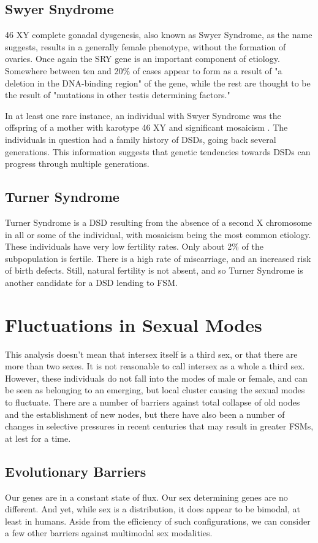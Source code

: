 \documentclass{article}
\begin{document}
\subsection{Swyer Snydrome}
46 XY complete gonadal dysgenesis, also known as Swyer Syndrome, as the name suggests, results in a generally female phenotype, without the formation of ovaries. Once again the SRY gene is an important component of etiology. Somewhere between ten and 20\% of cases appear to form as a result of "a deletion in the DNA-binding region" of the gene, while the rest are thought to be the result of "mutations in other testis determining factors."\cite{Michala2008}

In at least one rare instance, an individual with Swyer Syndrome was the offspring of a mother with karotype 46 XY and significant mosaicism \cite{Dumic2008}. The individuals in question had a family history of DSDs, going back several generations\cite{Dumic2008}. This information suggests that genetic tendencies towards DSDs can progress through multiple generations. 
\subsection{Turner Syndrome}
Turner Syndrome is a DSD resulting from the absence of a second X chromosome in all or some of the individual, with mosaicism being the most common etiology. These individuals have very low fertility rates. Only about 2\% of the subpopulation is fertile. There is a high rate of miscarriage, and an increased risk of birth defects.\cite{Abir2001} Still, natural fertility is not absent, and so Turner Syndrome is another candidate for a DSD lending to FSM. 
\section{Fluctuations in Sexual Modes}
This analysis doesn't mean that intersex itself is a third sex, or that there are more than two sexes. It is not reasonable to call intersex as a whole a third sex\cite{Carpenter2018}. However, these individuals do not fall into the modes of male or female, and can be seen as belonging to an emerging, but local cluster causing the sexual modes to fluctuate. There are a number of barriers against total collapse of old nodes and the establishment of new nodes, but there have also been a number of changes in selective pressures in recent centuries that may result in greater FSMs, at lest for a time.  
\subsection{Evolutionary Barriers}
Our genes are in a constant state of ﬂux. Our sex determining genes are no diﬀerent. And yet, while sex is a distribution, it does appear to be bimodal, at least in humans. Aside from the eﬃciency of such conﬁgurations, we can consider a few other barriers against multimodal sex modalities.
\end{document}
